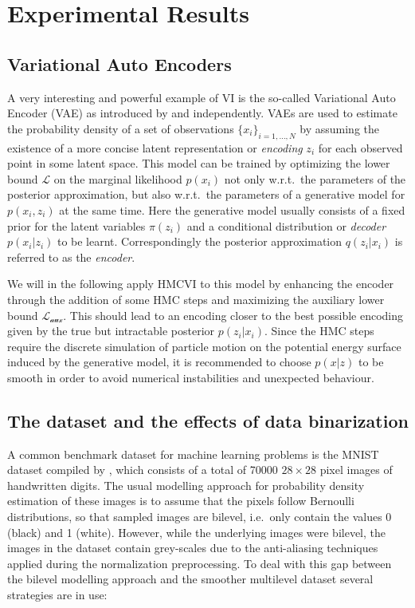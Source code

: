 \section{Experimental Results}
\label{sec:Experiments}
\subsection{Variational Auto Encoders}

A very interesting and powerful example of VI is the so-called Variational Auto Encoder (VAE) as introduced by \textcite{Kingma2014} and \textcite{Rezende2014} independently. VAEs are used to estimate the probability density of a set of observations $\{x_i\}_{i=1, \dots, N}$ by assuming the existence of a more concise latent representation or \textit{encoding} $z_i$ for each observed point in some latent space. This model can be trained by optimizing the lower bound $\mathcal{L}$ on the marginal likelihood $p(x_i)$ not only w.r.t.\ the parameters of the posterior approximation, but also w.r.t.\ the parameters of a generative model for $p(x_i, z_i)$ at the same time. Here the generative model usually consists of a fixed prior for the latent variables $\pi(z_i)$ and a conditional distribution or \textit{decoder} $p(x_i|z_i)$ to be learnt. Correspondingly the posterior approximation $q(z_i|x_i)$ is referred to as the \textit{encoder}.

We will in the following apply HMCVI to this model by enhancing the encoder through the addition of some HMC steps and maximizing the auxiliary lower bound $\mathcal{L_\textrm{aux}}$. This should lead to an encoding closer to the best possible encoding given by the true but intractable posterior $p(z_i|x_i)$. Since the HMC steps require the discrete simulation of particle motion on the potential energy surface induced by the generative model, it is recommended to choose $p(x|z)$ to be smooth in order to avoid numerical instabilities and unexpected behaviour.

\subsection{The dataset and the effects of data binarization}
\label{sec:Dataset}
A common benchmark dataset for machine learning problems is the MNIST dataset compiled by \textcite{LeCun1998}, which consists of a total of 70000 $28 \times 28$ pixel images of handwritten digits. The usual modelling approach for probability density estimation of these images is to assume that the pixels follow Bernoulli distributions, so that sampled images are bilevel, i.e.\ only contain the values 0 (black) and 1 (white). However, while the underlying images were bilevel, the images in the dataset contain grey-scales due to the anti-aliasing techniques applied during the normalization preprocessing. To deal with this gap between the bilevel modelling approach and the smoother multilevel dataset several strategies are in use:

